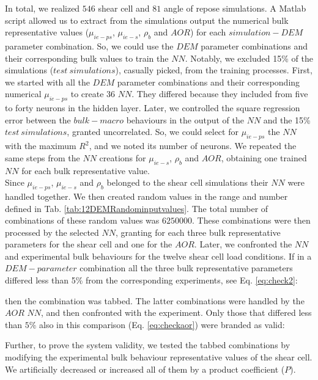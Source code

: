 In total, we realized $546$ shear cell and $81$ angle of repose simulations.
A Matlab script allowed us to extract from the simulations output the numerical
bulk representative values ($\mu_{ie-ps}$, $\mu_{ie-s}$, $\rho_b$ and $AOR$) for each $simulation-DEM$ parameter combination. 
So, we could use the $DEM$ parameter combinations and their corresponding bulk values to train the $NN$. 
Notably, we excluded 15\% of the simulations ($test ~ simulations$), casually
picked, from the training processes.
First, we started with all the $DEM$ parameter combinations and their corresponding numerical $\mu_{ie-ps}$ to create 36 $NN$. 
They differed because they included from five to forty neurons in the hidden
layer.
Later, we controlled the square regression error between the $bulk-macro$ behaviours in the output of 
the $NN$ and the 15\% $test ~ simulations$, granted uncorrelated. 
So, we could select for $\mu_{ie-ps}$ the $NN$ with the maximum $R^2$, and we noted its number of neurons. 
We repeated the same steps from the $NN$ creations for $\mu_{ie-s}$, $\rho_b$ and $AOR$, 
obtaining one trained $NN$ for each bulk representative value. \\
% 
Since $\mu_{ie-ps}$, $\mu_{ie-s}$ and $\rho_b$ belonged to the shear cell
simulations their $NN$ were handled together. We then created random values in the range
and number defined in Tab. \ref{tab:12DEMRandominputvalues}.
The total number of combinations of these random values was $6250000$. These
combinations were then processed by the selected $NN$, granting for each three bulk representative parameters for the shear cell and one for the $AOR$. Later, we confronted the $NN$ and experimental bulk behaviours for the twelve shear cell load conditions. 
If in a $DEM-parameter$ combination all the three bulk representative parameters differed less 
than 5\% from the corresponding experiments, see Eq. \ref{eq:check2}:

then the combination was tabbed. The latter combinations were handled by the $AOR$ $NN$, and then confronted with the experiment. 
Only those that differed less than $5\%$ also in this comparison (Eq.
\ref{eq:checkaor}) were branded as valid:

Further, to prove the system validity, we tested the tabbed combinations by modifying the experimental bulk
behaviour representative values of the shear cell. 
We artificially decreased or increased all of them by a product coefficient ($P$).






